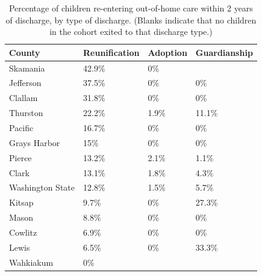 \documentclass{article}\usepackage{graphicx, color}
\begin{document}
\begin{table}[ht]
\centering
\caption{Percentage of children re-entering out-of-home care within 2 years of discharge, by type of discharge. (Blanks indicate that no children in the cohort exited to that discharge type.)} 
\begin{tabular}{llll}
  \toprule
County & Reunification & Adoption & Guardianship \\ 
  \midrule
Skamania & 42.9\% & 0\% &  \\ 
  Jefferson & 37.5\% & 0\% & 0\% \\ 
  Clallam & 31.8\% & 0\% & 0\% \\ 
  Thurston & 22.2\% & 1.9\% & 11.1\% \\ 
  Pacific & 16.7\% & 0\% & 0\% \\ 
  Grays Harbor & 15\% & 0\% & 0\% \\ 
  Pierce & 13.2\% & 2.1\% & 1.1\% \\ 
  Clark & 13.1\% & 1.8\% & 4.3\% \\ 
  Washington State & 12.8\% & 1.5\% & 5.7\% \\ 
  Kitsap & 9.7\% & 0\% & 27.3\% \\ 
  Mason & 8.8\% & 0\% & 0\% \\ 
  Cowlitz & 6.9\% & 0\% & 0\% \\ 
  Lewis & 6.5\% & 0\% & 33.3\% \\ 
  Wahkiakum & 0\% &  &  \\ 
   \bottomrule
\end{tabular}
\end{table}




\end{document}

